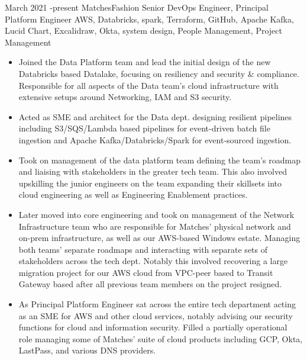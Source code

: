 \documentclass[10pt]{article} %
\begin{document}
\jobheader
{March 2021 -}{present}
{MatchesFashion}
{Senior DevOps Engineer, Principal Platform Engineer}
{
      AWS, Databricks, spark, Terraform, GitHub, Apache Kafka, Lucid Chart, Excalidraw,
      Okta, system design, People Management, Project Management
}
  \begin{itemize}

      \item Joined the Data Platform team and lead the initial design of the new Databricks based
            Datalake, focusing on resiliency and security \& compliance. Responsible for all aspects
            of the Data team's cloud infrastructure with extensive setups around Networking, IAM
            and S3 security.

      \item Acted as SME and architect for the Data dept. designing resilient pipelines
            including S3/SQS/Lambda based pipelines for event-driven batch file ingestion
            and Apache Kafka/Databricks/Spark for event-sourced ingestion.

      \item Took on management of the data platform team defining
            the team's roadmap and liaising with stakeholders in the greater tech team.
            This also involved upskilling the junior engineers on the team
            expanding their skillsets into cloud engineering as well as Engineering Enablement practices.

      \item Later moved into core engineering and took on management of the Network
            Infrastructure team who are responsible for Matches' physical network and on-prem
            infrastructure, as well as our AWS-based Windows estate. Managing both teams' separate
            roadmaps and interacting with separate sets of stakeholders across the tech dept.
            Notably this involved recovering a large migration project for our AWS cloud from VPC-peer
            based to Transit Gateway based after all previous team members on the project resigned.

      \item As Principal Platform Engineer sat across the entire tech department acting as an
            SME for AWS and other cloud services, notably advising our security functions for cloud
            and information security. Filled a partially operational role managing some of Matches'
            suite of cloud products including GCP, Okta, LastPass, and various DNS providers.

  \end{itemize}
\end{document}
